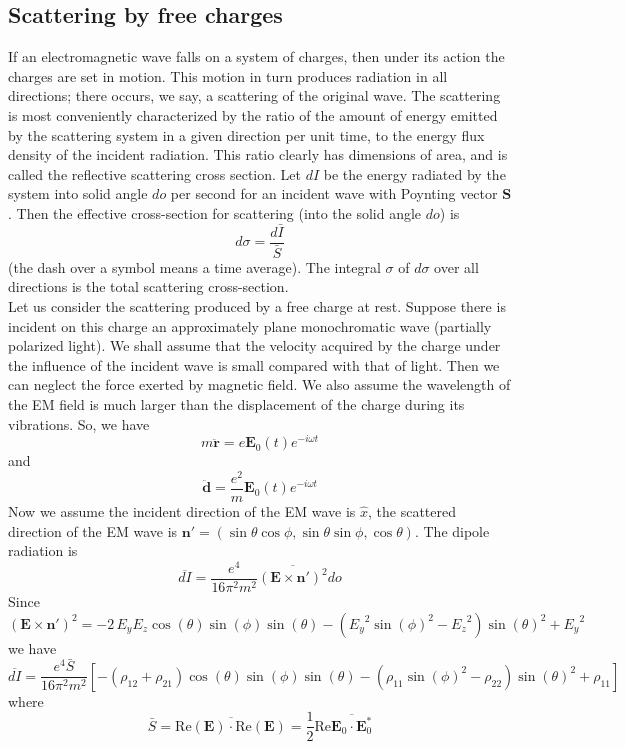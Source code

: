 \subsection{Scattering by free charges}
If an electromagnetic wave falls on a system of charges, then under its action the charges are set in motion. This motion in turn produces radiation in all directions; there occurs, we say, a scattering of the original wave. 
The scattering is most conveniently characterized by the ratio of the amount of energy emitted by the scattering system in a given direction per unit time, to the energy flux density of the incident radiation. This ratio clearly has dimensions of area, and is called the reflective
scattering cross section. 
Let $dI$ be the energy radiated by the system into solid angle $do$ per second for an incident wave with Poynting vector $\bm{S}$. Then the effective cross-section for scattering (into the solid angle $do$) is
\[d\sigma = \frac{d\bar{I}}{\bar{S}}\]
(the dash over a symbol means a time average). The integral $\sigma$ of $d\sigma$ over all directions is the total scattering cross-section.\\
Let us consider the scattering produced by a free charge at rest. Suppose there is incident on this charge an approximately plane monochromatic wave (partially polarized light). We shall assume that the velocity acquired by the charge under the influence of the incident wave is small compared with that of light. Then we can neglect the force exerted by magnetic field. We also assume the wavelength of the EM field is much larger than the displacement of the charge during its vibrations. So, we have
\[m\ddot{\bm{r}} = e\bm{E}_0(t) e^{-i\omega t}\]
and
\[\ddot{\bm{d}} = \frac{e^2}{m} \bm{E}_0(t) e^{-i\omega t}\]
Now we assume the incident direction of the EM wave is $\hat{x}$, the scattered direction of the EM wave is $\bm{n}' =(\sin\theta\cos\phi,\sin\theta\sin\phi,\cos\theta)$. The dipole radiation is
\[\overline{dI} = \frac{e^4}{16\pi^2 m^2}\overline{(\bm{E}\times\bm{n}')^2} do\]
Since
\[(\bm{E}\times\bm{n}')^2 = -2 \, {E_y} {E_z} \cos\left({\theta}\right) \sin\left({\phi}\right)
\sin\left({\theta}\right) - {\left({E_y}^{2} \sin\left({\phi}\right)^{2}
- {E_z}^{2}\right)} \sin\left({\theta}\right)^{2} + {E_y}^{2}\]
we have
\[\overline{dI} = \frac{e^4 \bar{S}}{16\pi^2 m^2}[-(\rho_{12}+\rho_{21})\cos\left({\theta}\right)\sin\left({\phi}\right)
\sin\left({\theta}\right) - {\left(\rho_{11} \sin\left({\phi}\right)^{2}
- \rho_{22}\right)} \sin\left({\theta}\right)^{2} + \rho_{11} ]\]
where
\[\bar{S} = \overline{\mathrm{Re}(\bm{E})\cdot \mathrm{Re}(\bm{E})} = \frac{1}{2}\mathrm{Re}\overline{\bm{E}_0 \cdot \bm{E}^*_0}\]
